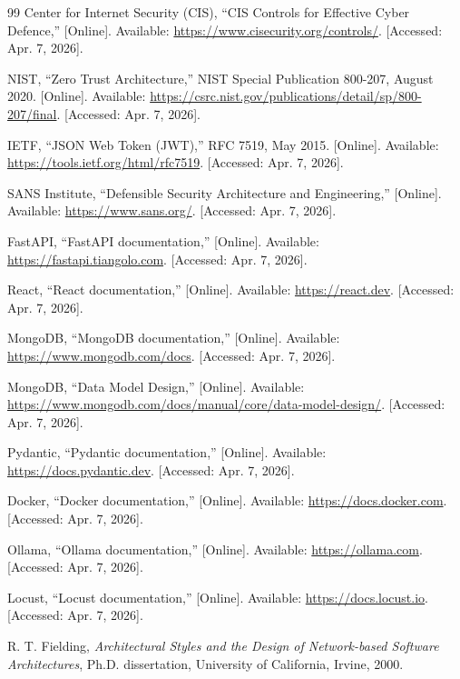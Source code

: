 \begin{thebibliography}{99}
Center for Internet Security (CIS),
\newblock ``CIS Controls for Effective Cyber Defence,'' [Online]. Available: \url{https://www.cisecurity.org/controls/}. [Accessed: Apr. 7, 2026].

NIST,
\newblock ``Zero Trust Architecture,'' NIST Special Publication 800-207, August 2020. [Online]. Available: \url{https://csrc.nist.gov/publications/detail/sp/800-207/final}. [Accessed: Apr. 7, 2026].

IETF,
\newblock ``JSON Web Token (JWT),'' RFC 7519, May 2015. [Online]. Available: \url{https://tools.ietf.org/html/rfc7519}. [Accessed: Apr. 7, 2026].

SANS Institute,
\newblock ``Defensible Security Architecture and Engineering,'' [Online]. Available: \url{https://www.sans.org/}. [Accessed: Apr. 7, 2026].

FastAPI,
\newblock ``FastAPI documentation,'' [Online]. Available: \url{https://fastapi.tiangolo.com}. [Accessed: Apr. 7, 2026].

React,
\newblock ``React documentation,'' [Online]. Available: \url{https://react.dev}. [Accessed: Apr. 7, 2026].

MongoDB,
\newblock ``MongoDB documentation,'' [Online]. Available: \url{https://www.mongodb.com/docs}. [Accessed: Apr. 7, 2026].

MongoDB,
\newblock ``Data Model Design,'' [Online]. Available: \url{https://www.mongodb.com/docs/manual/core/data-model-design/}. [Accessed: Apr. 7, 2026].

Pydantic,
\newblock ``Pydantic documentation,'' [Online]. Available: \url{https://docs.pydantic.dev}. [Accessed: Apr. 7, 2026].

Docker,
\newblock ``Docker documentation,'' [Online]. Available: \url{https://docs.docker.com}. [Accessed: Apr. 7, 2026].

Ollama,
\newblock ``Ollama documentation,'' [Online]. Available: \url{https://ollama.com}. [Accessed: Apr. 7, 2026].

Locust,
\newblock ``Locust documentation,'' [Online]. Available: \url{https://docs.locust.io}. [Accessed: Apr. 7, 2026].

R. T. Fielding,
\newblock \textit{Architectural Styles and the Design of Network-based Software Architectures}, Ph.D. dissertation, University of California, Irvine, 2000.


\end{thebibliography}
